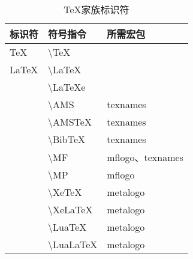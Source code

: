 \documentclass[UTF8,fontset=ubuntu]{ctexart}
\begin{document}
\begin{table}[H]
	\begin{tabular}{l l l}
		\hline
		标识符 & 符号指令 & 所需宏包\\\hline
		\TeX & \textbackslash TeX &\\
		\LaTeX & \textbackslash LaTeX &\\
		\LaTeXe & \textbackslash LaTeXe &\\
		\AMS & \textbackslash AMS & texnames\\
		\AMSTeX & \textbackslash AMSTeX & texnames\\
		\BibTeX & \textbackslash BibTeX & texnames\\
		\MF & \textbackslash MF & mflogo、texnames\\
		\MP & \textbackslash MP & mflogo\\
		\XeTeX & \textbackslash XeTeX & metalogo\\
		\XeLaTeX & \textbackslash XeLaTeX & metalogo\\
		\LuaTeX & \textbackslash LuaTeX & metalogo\\
		\LuaLaTeX & \textbackslash LuaLaTeX & metalogo\\
		\hline
	\end{tabular}
	\caption{TeX家族标识符}
\end{table}
\end{document}
